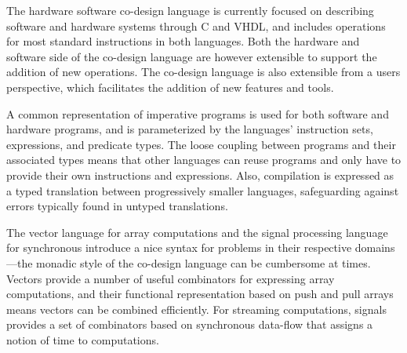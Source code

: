 \documentclass[../paper.tex]{subfiles}
\begin{document}
The hardware software co-design language is currently focused on describing software and hardware systems through C and VHDL, and includes operations for most standard instructions in both languages. Both the hardware and software side of the co-design language are however extensible to support the addition of new operations. The co-design language is also extensible from a users perspective, which facilitates the addition of new features and tools.

A common representation of imperative programs is used for both software and hardware programs, and is parameterized by the languages' instruction sets, expressions, and predicate types. The loose coupling between programs and their associated types means that other languages can reuse programs and only have to provide their own instructions and expressions. Also, compilation is expressed as a typed translation between progressively smaller languages, safeguarding against errors typically found in untyped translations.

The vector language for array computations and the signal processing language for synchronous introduce a nice syntax for problems in their respective domains---the monadic style of the co-design language can be cumbersome at times. Vectors provide a number of useful combinators for expressing array computations, and their functional representation based on push and pull arrays means vectors can be combined efficiently. For streaming computations, signals provides a set of combinators based on synchronous data-flow that assigns a notion of time to computations.
\end{document}
